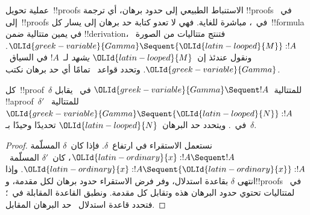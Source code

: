 \documentclass[../../../include/open-logic-section]{subfiles}
\begin{document}


عملية تحويل~!!{proof}s الاستنباط الطبيعي إلى حدود برهان، أي ترجمة
!!{proof}s في~ إلى~!!{proof}s في~، مباشرة للغاية. فهي
لا تعدو كتابة حد برهان إلى يسار كل~!!{formula} في يمين متتالية ضمن
!!{derivation}، فتنتج متتاليات من الصورة~${\OLId{greek-variable}{Gamma}}\Sequent {\OLId{latin-looped}{M}}:!A$. ونقول عندئذ
إن~${\OLId{latin-looped}{M}}$ \emph{يشهد} لـ~$!A$ في السياق~${\OLId{greek-variable}{Gamma}}$. وتحدد قواعد~
تمامًا أي حد برهان نكتب.

\begin{prop}
كل~!!{proof}~$\delta$ للمتتالية~${\OLId{greek-variable}{Gamma}}\Sequent !A$ في~ يقابل
!!a{proof}~$\delta'$ للمتتالية~${\OLId{greek-variable}{Gamma}}\Sequent {\OLId{latin-looped}{N}}:!A$ في~.
ويتحدد حد البرهان~${\OLId{latin-looped}{N}}$ تحديدًا وحيدًا بـ~$\delta$.
\end{prop}

\begin{proof}
نستعمل الاستقراء في ارتفاع~$\delta$. فإذا كان~$\delta$ المسلّمة
${\OLId{latin-ordinary}{x}}:!A\Sequent !A$، كان~$\delta'$ المسلّمة~${\OLId{latin-ordinary}{x}}:!A\Sequent {\OLId{latin-ordinary}{x}}:!A$. وإذا انتهى
$\delta$ بقاعدة استدلال، وفر فرض الاستقراء حدود برهان لكل مقدمة، و!!{proof}s
في~ لمتتاليات تحتوي حدود البرهان هذه وتقابل كل مقدمة. ونطبق
القاعدة المقابلة في~؛ فتحدد قاعدة استدلال~ حد البرهان
المقابل.
\end{proof}
\end{document}

